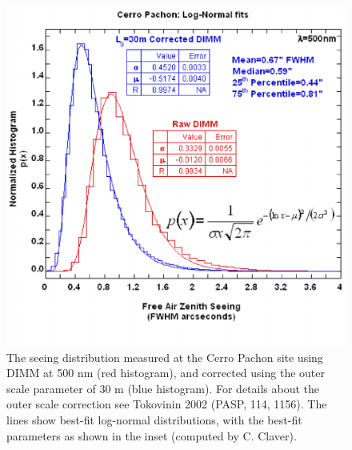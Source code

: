 \newpage
{}

\bigskip

\begin{figure}[h!]\centering
\includegraphics[width=13cm]{CerroPachonSeeing.ps}
\caption{The seeing distribution measured at the Cerro Pachon site using DIMM at
500 nm (red histogram), and corrected using the outer scale parameter of 30 m
(blue histogram). For details about the outer scale correction see Tokovinin
2002 (PASP, 114, 1156). The lines show best-fit log-normal distributions, with
the best-fit parameters as shown in the inset (computed by C. Claver).}
\end{figure}



